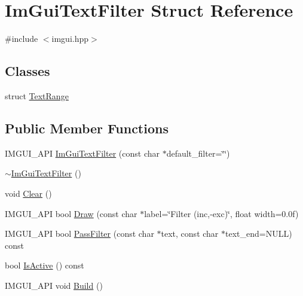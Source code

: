 \hypertarget{struct_im_gui_text_filter}{}\section{Im\+Gui\+Text\+Filter Struct Reference}
\label{struct_im_gui_text_filter}


{\ttfamily \#include $<$imgui.\+hpp$>$}

\subsection*{Classes}
\begin{DoxyCompactItemize}
\item 
struct \hyperlink{struct_im_gui_text_filter_1_1_text_range}{Text\+Range}
\end{DoxyCompactItemize}
\subsection*{Public Member Functions}
\begin{DoxyCompactItemize}
\item 
I\+M\+G\+U\+I\+\_\+\+A\+PI \hyperlink{struct_im_gui_text_filter_a0a61ee76f0b4f3c354791734b06e3140}{Im\+Gui\+Text\+Filter} (const char $\ast$default\+\_\+filter=\char`\"{}\char`\"{})
\item 
\hyperlink{struct_im_gui_text_filter_acaf7fdcdc879c7938d195714609aac87}{$\sim$\+Im\+Gui\+Text\+Filter} ()
\item 
void \hyperlink{struct_im_gui_text_filter_a9043c1f0c33d29e6fc9b75ae81f9705a}{Clear} ()
\item 
I\+M\+G\+U\+I\+\_\+\+A\+PI bool \hyperlink{struct_im_gui_text_filter_ab93ad5985019ff9d3781606551fc26cc}{Draw} (const char $\ast$label=\char`\"{}Filter (inc,-\/exc)\char`\"{}, float width=0.\+0f)
\item 
I\+M\+G\+U\+I\+\_\+\+A\+PI bool \hyperlink{struct_im_gui_text_filter_a88d73ff8b81fbbd0a129b1bf3498d8aa}{Pass\+Filter} (const char $\ast$text, const char $\ast$text\+\_\+end=N\+U\+LL) const
\item 
bool \hyperlink{struct_im_gui_text_filter_a493158f2ab8f45fcf303c3f953be9b88}{Is\+Active} () const
\item 
I\+M\+G\+U\+I\+\_\+\+A\+PI void \hyperlink{struct_im_gui_text_filter_aef362baafaa9dfa62d11bc6101c0f4c1}{Build} ()
\end{DoxyCompactItemize}
